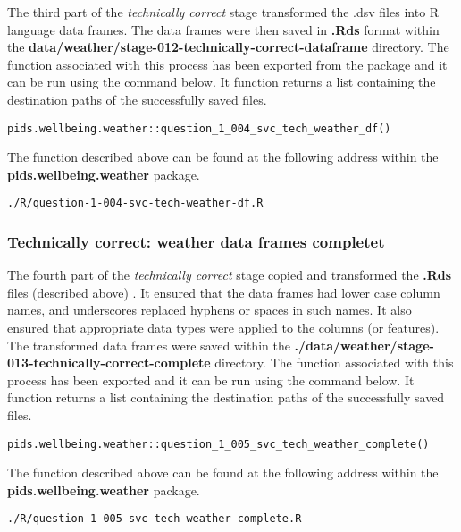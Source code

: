 \documentclass[12pt, oneside, openany]{book}
\begin{document}
The third part of the \emph{technically correct} stage transformed the .dsv files into R language data frames. The data frames were then saved in \textbf{.Rds} format within the \textbf{data/weather/stage-012-technically-correct-dataframe} directory. The function associated with this process has been exported from the package and it can be run using the command below. It function returns a list containing the destination paths of the successfully saved files.

\begin{verbatim}
pids.wellbeing.weather::question_1_004_svc_tech_weather_df()
\end{verbatim}

The function described above can be found at the following address within the \textbf{pids.wellbeing.weather} package.

\begin{verbatim}
./R/question-1-004-svc-tech-weather-df.R
\end{verbatim}

\subsubsection*{Technically correct: weather data frames completet}

The fourth part of the \emph{technically correct} stage copied and transformed the \textbf{.Rds} files (described above) . It ensured that the data frames had lower case column names, and underscores replaced hyphens or spaces in such names. It also ensured that appropriate data types were applied to the columns (or features). The transformed data frames were saved within the \textbf{./data/weather/stage-013-technically-correct-complete} directory. The function associated with this process has been exported and it can be run using the command below. It function returns a list containing the destination paths of the successfully saved files.

\begin{verbatim}
pids.wellbeing.weather::question_1_005_svc_tech_weather_complete()
\end{verbatim}

The function described above can be found at the following address within the \textbf{pids.wellbeing.weather} package.

\begin{verbatim}
./R/question-1-005-svc-tech-weather-complete.R
\end{verbatim}
\end{document}
